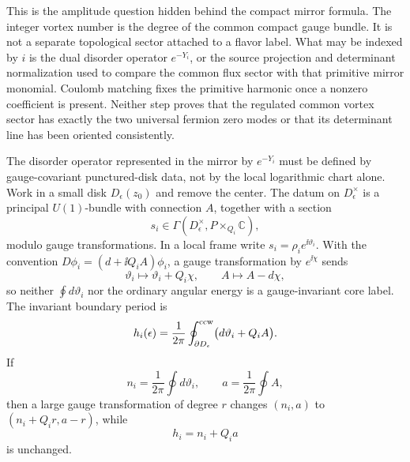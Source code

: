 This is the amplitude question hidden behind the compact mirror formula.  The
integer vortex number is the degree of the common compact gauge bundle.  It is
not a separate topological sector attached to a flavor label.  What may be
indexed by \(i\) is the dual disorder operator \(e^{-Y_i}\), or the source
projection and determinant normalization used to compare the common flux
sector with that primitive mirror monomial.  Coulomb matching fixes the
primitive harmonic once a nonzero coefficient is present.  Neither step proves
that the regulated common vortex sector has exactly the two universal fermion
zero modes or that its determinant line has been oriented consistently.

\begin{construction}
\label{constr:glsm-vortex-core-disorder-datum}
The disorder operator represented in the mirror by \(e^{-Y_i}\) must be
defined by gauge-covariant punctured-disk data, not by the local logarithmic
chart alone.  Work in a small disk \(D_\epsilon(z_0)\) and remove the center.
The datum on \(D_\epsilon^\times\) is a principal \(U(1)\)-bundle with
connection \(A\), together with a section
\[
  s_i\in\Gamma\!\left(D_\epsilon^\times,
  P\times_{Q_i}\mathbb C\right),
\]
modulo gauge transformations.  In a local frame write
\(s_i=\rho_i e^{\ii\vartheta_i}\).  With the convention
\(D\phi_i=(d+\ii Q_iA)\phi_i\), a gauge transformation by
\(e^{\ii\chi}\) sends
\[
  \vartheta_i\mapsto\vartheta_i+Q_i\chi,\qquad
  A\mapsto A-d\chi,
\]
so neither \(\oint d\vartheta_i\) nor the ordinary angular energy is a
gauge-invariant core label.  The invariant boundary period is
\begin{equation}
  h_i(\epsilon)
  =
  \frac1{2\pi}
  \oint_{\partial D_\epsilon}^{\rm ccw}
  \bigl(d\vartheta_i+Q_iA\bigr).
  \label{eq:glsm-vortex-core-covariant-winding}
\end{equation}
If
\[
  n_i=\frac1{2\pi}\oint d\vartheta_i,\qquad
  a=\frac1{2\pi}\oint A,
\]
then a large gauge transformation of degree \(r\) changes
\((n_i,a)\) to \((n_i+Q_ir,a-r)\), while
\[
  h_i=n_i+Q_ia
\]
is unchanged.


\end{construction}
